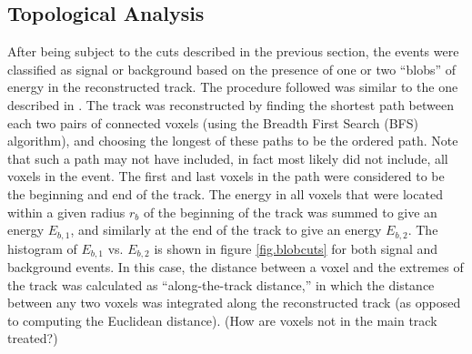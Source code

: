 \documentclass[a4paper,11pt]{article}
\begin{document}
\subsection{Topological Analysis}\label{ssec:TopologicalAnalysis}
After being subject to the cuts described in the previous section, the events were classified as signal or background based on the presence of one or two ``blobs'' of energy in the
reconstructed track.  The procedure followed was similar to the one described in \cite{NEXT_topology}.  The track was reconstructed by finding the shortest path between each two 
pairs of connected voxels (using the Breadth First Search (BFS) algorithm), and choosing the longest of these paths to be the ordered path.  Note that such a path may not have included, 
in fact most likely did not include, all voxels in the event.  The first and last voxels in the path
were considered to be the beginning and end of the track.  The energy in all voxels that were located within a given radius $r_b$ of the beginning of the track was summed to give
an energy $E_{b,1}$, and similarly at the end of the track to give an energy $E_{b,2}$.  The histogram of $E_{b,1}$ vs. $E_{b,2}$ is shown in figure \ref{fig.blobcuts} for both signal and
background events.  In this case, the distance between a voxel and the extremes of the track was calculated as 
``along-the-track distance,'' in which the distance between any two voxels was integrated along the reconstructed track (as opposed to computing the Euclidean distance).  (How are voxels
not in the main track treated?)
\end{document}
